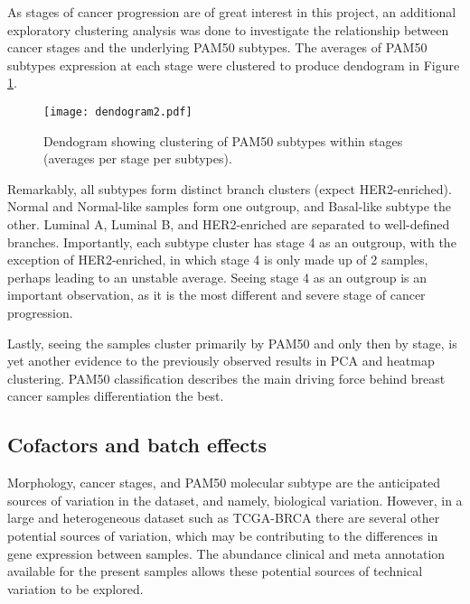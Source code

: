     
    As stages of cancer progression are of great interest in this project, an additional exploratory clustering analysis was done to investigate the relationship between cancer stages and the underlying PAM50 subtypes. The averages of PAM50 subtypes expression at each stage were clustered to produce dendogram in Figure \ref{fig:dendogram}. 
    
            \begin{figure}[!h]
            \centering
            \texttt{[image: dendogram2.pdf]}
            \caption[Dendogram of PAM50 and stage subgroups clustering]{Dendogram showing clustering of PAM50 subtypes within stages (averages per stage per subtypes).}
            \label{fig:dendogram}
            \end{figure}
    
    Remarkably, all subtypes form distinct branch clusters (expect HER2-enriched). Normal and Normal-like samples form one outgroup, and Basal-like subtype the other. Luminal A, Luminal B, and HER2-enriched are separated to well-defined branches. Importantly, each subtype cluster has stage 4 as an outgroup, with the exception of HER2-enriched, in which stage 4 is only made up of 2 samples, perhaps leading to an unstable average. Seeing stage 4 as an outgroup is an important observation, as it is the most different and severe stage of cancer progression. 
    
    Lastly, seeing the samples cluster primarily by PAM50 and only then by stage, is yet another evidence to the previously observed results in PCA and heatmap clustering. PAM50 classification describes the main driving force behind breast cancer samples differentiation the best.  
    

    
    \newpage
    \subsection{Cofactors and batch effects}
    
    Morphology, cancer stages, and PAM50 molecular subtype are the anticipated sources of variation in the dataset, and namely, biological variation. However, in a large and heterogeneous dataset such as TCGA-BRCA there are several other potential sources of variation, which may be contributing to the differences in gene expression between samples. The abundance clinical and meta annotation available for the present samples allows these potential sources of technical variation to be explored.
    
